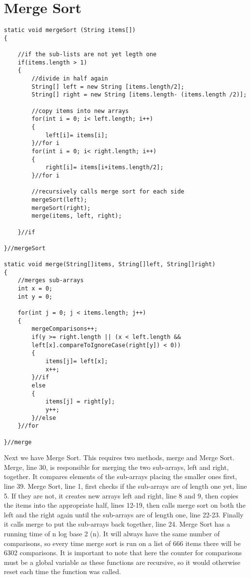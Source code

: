 \documentclass{article}
\begin{document}
\section{Merge Sort}
\begin{lstlisting}[frame =single,
backgroundcolor = \color{grey!12}]
static void mergeSort (String items[])
{

	//if the sub-lists are not yet legth one
	if(items.length > 1)
	{
		//divide in half again 
		String[] left = new String [items.length/2];
		String[] right = new String [items.length- (items.length /2)];
		
		//copy items into new arrays
		for(int i = 0; i< left.length; i++)
		{
			left[i]= items[i];
		}//for i
		for(int i = 0; i< right.length; i++)
		{
			right[i]= items[i+items.length/2];
		}//for i 
		
		//recursively calls merge sort for each side 
		mergeSort(left);
		mergeSort(right);
		merge(items, left, right);
		
	}//if

}//mergeSort

static void merge(String[]items, String[]left, String[]right)
{
	//merges sub-arrays
	int x = 0;
	int y = 0;
	
	for(int j = 0; j < items.length; j++)
	{
		mergeComparisons++;
		if(y >= right.length || (x < left.length &&
		left[x].compareToIgnoreCase(right[y]) < 0))
		{
			items[j]= left[x];
			x++;
		}//if
		else
		{
			items[j] = right[y];
			y++;
		}//else
	}//for
	
}//merge
\end{lstlisting}
\large
Next we have Merge Sort. This requires two methods, merge and Merge Sort. Merge, line 30, is responsible for merging the two sub-arrays, left and right, together. It compares elements of the sub-arrays placing the smaller ones first, line 39. Merge Sort, line 1, first checks if the sub-arrays are of length one yet, line 5. If they are not, it creates new arrays left and right, line 8 and 9, then copies the items into the appropriate half, lines 12-19, then calls merge sort on both the left and the right again until the sub-arrays are of length one, line 22-23. Finally it calls merge to put the sub-arrays back together, line 24. 
Merge Sort has a running time of n log base 2 (n). It will always have the same number of comparisons, so every time merge sort is run on a list of 666 items there will be 6302 comparisons. It is important to note that here the counter for comparisons must be a global variable as these functions are recursive, so it would otherwise reset each time the function was called. 
\end{document}
